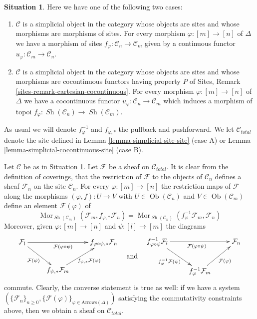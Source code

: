 \documentclass{stacks-project}
\theoremstyle{plain}
\theoremstyle{definition}
\newtheorem{situation}[subsection]{Situation}
\theoremstyle{remark}
\numberwithin{equation}{subsection}
\def\Mor{\mathop{\mathrm{Mor}}\nolimits}
\def\Ob{\mathop{\mathrm{Ob}}\nolimits}
\def\Sh{\mathop{\mathit{Sh}}\nolimits}
\begin{document}
\begin{situation}
\label{situation-simplicial-site}
Here we have one of the following two cases:
\begin{enumerate}
\item[(A)] $\mathcal{C}$ is a simplicial object in the category whose
objects are sites and whose morphisms are morphisms of sites. For every
morphism $\varphi : [m] \to [n]$ of $\Delta$ we have a morphism of sites
$f_\varphi : \mathcal{C}_n \to \mathcal{C}_m$ given by a continuous
functor $u_\varphi : \mathcal{C}_m \to \mathcal{C}_n$.
\item[(B)] $\mathcal{C}$ is a simplicial object in the category whose
objects are sites and whose morphisms are cocontinuous functors having
property $P$ of Sites, Remark \ref{sites-remark-cartesian-cocontinuous}.
For every morphism $\varphi : [m] \to [n]$ of $\Delta$ we have a cocontinuous
functor $u_\varphi : \mathcal{C}_n \to \mathcal{C}_m$ which induces a
morphism of topoi $f_\varphi : \Sh(\mathcal{C}_n) \to \Sh(\mathcal{C}_m)$.
\end{enumerate}
As usual we will denote $f_\varphi^{-1}$ and $f_{\varphi, *}$ the
pullback and pushforward. We let $\mathcal{C}_{total}$ denote the
site defined in
Lemma \ref{lemma-simplicial-site-site} (case A) or
Lemma \ref{lemma-simplicial-cocontinuous-site} (case B).
\end{situation}

\noindent
Let $\mathcal{C}$ be as in Situation \ref{situation-simplicial-site}.
Let $\mathcal{F}$ be a sheaf on $\mathcal{C}_{total}$.
It is clear from the definition of coverings, that the restriction
of $\mathcal{F}$ to the objects of $\mathcal{C}_n$ defines a sheaf
$\mathcal{F}_n$ on the site $\mathcal{C}_n$. For every
$\varphi : [m] \to [n]$ the restriction maps of $\mathcal{F}$
along the morphisms $(\varphi, f) : U \to V$ with 
$U \in \Ob(\mathcal{C}_n)$ and $V \in \Ob(\mathcal{C}_m)$
define an element $\mathcal{F}(\varphi)$ of
$$
\Mor_{\Sh(\mathcal{C}_m)}(\mathcal{F}_m, f_{\varphi, *}\mathcal{F}_n) =
\Mor_{\Sh(\mathcal{C}_n)}(f_\varphi^{-1}\mathcal{F}_m, \mathcal{F}_n)
$$
Moreover, given $\varphi : [m] \to [n]$ and $\psi : [l] \to [m]$
the diagrams
$$
\vcenter{
\xymatrix{
\mathcal{F}_l \ar[rr]_{\mathcal{F}(\varphi \circ \psi)}
\ar[rd]_{\mathcal{F}(\psi)}
& & f_{\varphi \circ \psi, *} \mathcal{F}_n \\
& f_{\psi, *}\mathcal{F}_m \ar[ur]_{f_{\psi, *}\mathcal{F}(\varphi)}
}
}
\quad\text{and}\quad
\vcenter{
\xymatrix{
f_{\varphi \circ \psi}^{-1}\mathcal{F}_l
\ar[rr]_{\mathcal{F}(\varphi \circ \psi)}
\ar[rd]_{f_\varphi^{-1}\mathcal{F}(\psi)}
& & \mathcal{F}_n \\
& f_\varphi^{-1}\mathcal{F}_m \ar[ur]_{\mathcal{F}(\varphi)}
}
}
$$
commute. Clearly, the converse statement is true as well: if we have a system
$(\{\mathcal{F}_n\}_{n \geq 0},
\{\mathcal{F}(\varphi)\}_{\varphi \in \text{Arrows}(\Delta)})$
satisfying the commutativity constraints above,
then we obtain a sheaf on $\mathcal{C}_{total}$.
\end{document}
